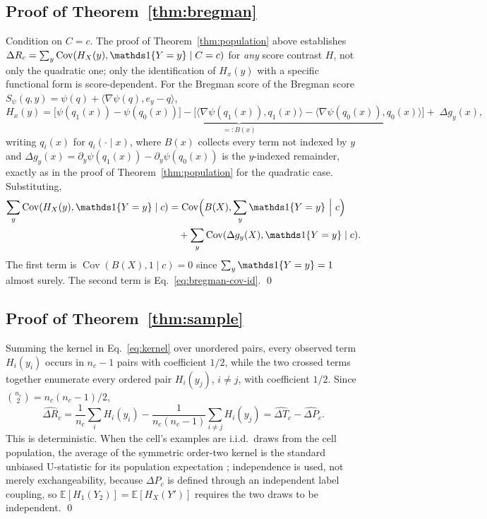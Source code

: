 \subsection{Proof of Theorem~\ref{thm:bregman}}
Condition on $C=c$. The proof of Theorem~\ref{thm:population} above establishes
$\Delta R_c=\sum_y\operatorname{Cov}(H_X(y),\ind\{Y=y\}\mid C=c)$ for \emph{any} score
contrast $H$, not only the quadratic one; only the identification of $H_x(y)$ with a
specific functional form is score-dependent. For the Bregman score of
the Bregman score $S_\psi(q,y)=\psi(q)+\langle\nabla\psi(q),e_y-q\rangle$,
\[
H_x(y)=\underbrace{\bigl[\psi(q_1(x))-\psi(q_0(x))\bigr]
-\bigl[\langle\nabla\psi(q_1(x)),q_1(x)\rangle-\langle\nabla\psi(q_0(x)),q_0(x)\rangle\bigr]}_{=:B(x)}
+\;\Delta g_y(x),
\]
writing $q_i(x)$ for $q_i(\cdot\mid x)$, where $B(x)$ collects every term not indexed by
$y$ and $\Delta g_y(x)=\partial_y\psi(q_1(x))-\partial_y\psi(q_0(x))$ is the $y$-indexed
remainder, exactly as in the proof of Theorem~\ref{thm:population} for the quadratic
case. Substituting,
\begin{align*}
\sum_y\operatorname{Cov}(H_X(y),\ind\{Y=y\}\mid c)
&=\operatorname{Cov}\Bigl(B(X),\sum_y\ind\{Y=y\}\ \Big|\ c\Bigr)\\
&\quad+\sum_y\operatorname{Cov}(\Delta g_y(X),\ind\{Y=y\}\mid c).
\end{align*}
The first term is $\operatorname{Cov}(B(X),1\mid c)=0$ since $\sum_y\ind\{Y=y\}=1$
almost surely. The second term is Eq.~\eqref{eq:bregman-cov-id}. \qed

\subsection{Proof of Theorem~\ref{thm:sample}}
Summing the kernel in Eq.~\eqref{eq:kernel} over unordered pairs, every observed term
$H_i(y_i)$ occurs in $n_c-1$ pairs with coefficient $1/2$, while the two crossed terms
together enumerate every ordered pair $H_i(y_j)$, $i\ne j$, with coefficient $1/2$.
Since $\binom{n_c}{2}=n_c(n_c-1)/2$,
\[
\widehat{\Delta R}_c
=\frac1{n_c}\sum_iH_i(y_i)
-\frac1{n_c(n_c-1)}\sum_{i\ne j}H_i(y_j)
=\widehat{\Delta T}_c-\widehat{\Delta P}_c.
\]
This is deterministic. When the cell's examples are i.i.d.\ draws from the cell
population, the average of the symmetric order-two kernel is the standard unbiased
U-statistic for its population expectation \cite{hoeffding1948class}; independence is
used, not merely exchangeability, because $\Delta P_c$ is defined through an independent
label coupling, so $\mathbb E[H_1(Y_2)]=\mathbb E[H_X(Y')]$ requires the two draws to be
independent. \qed

